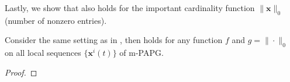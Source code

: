 \documentclass[leqno,onefignum,onetabnum]{siamart0516}
\newcommand{\xb}{\mathbf{x}}
\newcommand{\prox}[2][\eta]{\mathrm{prox}_{#2}^{#1}}
\newcommand{\mspg}{\textsf{m-PAPG}\xspace}
\begin{document}

Lastly, we show that  also holds for the important cardinality function $\|\xb\|_0$ (number of nonzero entries).
\begin{lemma}\label{thm:example}
	Consider the same setting as in , %
	then  holds for any function $f$ and $g = \|\cdot\|_0$ on all local sequences $\{\xb^i(t)\}$ of \mspg.	
	\end{lemma}
\begin{proof}




\end{proof}
\end{document}
